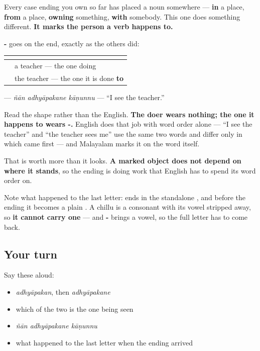 \begin{grammarlens}[title={Grammar Lens: an ending for the one it is done to}]
Every case ending you own so far has placed a noun somewhere — \textbf{in} a place, \textbf{from} a place, \textbf{owning} something, \textbf{with} somebody. This one does something different. \textbf{It marks the person a verb happens to.}

\textbf{-} goes on the end, exactly as the others did:

\noindent
\begin{tabularx}{\linewidth}{@{}>{\raggedright\arraybackslash}X>{\raggedright\arraybackslash}X@{}}
\toprule
\textbf{} & \textbf{} \\
\midrule
\textbf{\ml{അധ്യാപകൻ}} & a teacher — the one doing \\
\textbf{\ml{അധ്യാപകനെ}} & the teacher — the one it is done \textbf{to} \\
\bottomrule
\end{tabularx}

\textbf{  } — \emph{ñān adhyāpakane kāṇunnu} — \textquotedblleft{}I see the teacher.\textquotedblright{}

Read the shape rather than the English. \textbf{The doer wears nothing; the one it happens to wears -.} English does that job with word order alone — \textquotedblleft{}I see the teacher\textquotedblright{} and \textquotedblleft{}the teacher sees me\textquotedblright{} use the same two words and differ only in which came first — and Malayalam marks it on the word itself.

That is worth more than it looks. \textbf{A marked object does not depend on where it stands}, so the ending is doing work that English has to spend its word order on.

Note what happened to the last letter: \textbf{} ends in the standalone \textbf{}, and before the ending it becomes a plain \textbf{}. A chillu is a consonant with its vowel stripped away, so \textbf{it cannot carry one} — and \textbf{-} brings a vowel, so the full letter has to come back.
\end{grammarlens}

\subsection*{Your turn}
Say these aloud:

\begin{itemize}
\raggedright
  \item \emph{adhyāpakan}, then \emph{adhyāpakane}
  \item which of the two is the one being seen
  \item \emph{ñān adhyāpakane kāṇunnu}
  \item what happened to the last letter when the ending arrived
\end{itemize}

